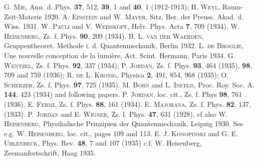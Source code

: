 \begin{thebibliography}{14}
 \textsc{G. Mie}, Ann. d. Phys. \textbf{37}, 512, \textbf{39}, 1 and \textbf{40}, 1 (1912-1913); \textsc{H. Weyl}, Raum-Zeit-Materie 1920. \textsc{A. Einstein} and \textsc{W. Mayer}, Sitz. Ber. der Preuss. Akad. d. Wiss. 1931.
 \textsc{W. Pauli} and \textsc{V. Weisskopf}, Helv. Phys. Acta \textbf{7}, 709 (1934).
 \textsc{W. Heisenberg}, Zs. f. Phys. \textbf{90}, 209 (1934).
 \textsc{B. L. van der Waerden}, Gruppentheoret. Methode i. d. Quantenmechanik, Berlin 1932.
 \textsc{L. de Broglie}, Une nouvelle conception de la lumi\`ere, Act. Scint. Hermann, Paris 1934.
 \textsc{G. Wentzel}, Zs. f. Phys. \textbf{92}, 337 (1934); \textsc{P. Jordan}, Zs. f. Phys. \textbf{93}, 464 (1935), \textbf{98}, 709 and 759 (1936); \textsc{R. de L. Kronig}, Physica \textbf{2}, 491, 854, 968 (1935); \textsc{O. Scherzer}, Zs. f. Phys. \textbf{97}, 725 (1935).
 \textsc{M. Born} and \textsc{L. Infeld}, Proc. Roy. Soc. A. \textbf{144}, 423 (1934) and following papers.
 \textsc{P. Jordan}, loc. cit., Zs. f. Phys \textbf{98}, 761 . (1936).
 \textsc{E. Fermi}, Zs. f. Phys. \textbf{88}, 161 (1934).
 \textsc{E. Majorana}, Zs. f. Phys. \textbf{82}, 137, (1933).
 \textsc{P. Jordan} and \textsc{E. Wigner}, Zs. f. Phys. \textbf{47}, 631 (1928), cf also \textsc{W. Heisenberg}, Physikalische Prinzipien der Quantenmechanik, Leipzig 1930.
 See e.g. \textsc{W. Heisenberg}, loc. cit.\cite{11}, pages 109 and 113.
 \textsc{E. J. Konopinski} and \textsc{G. E. Uhlenbeck}, Phys. Rev. \textbf{48}, 7 and 107 (1935)
 c.f. W. Heisenberg, Zeemanfestschrift, Haag 1935.
\end{thebibliography}